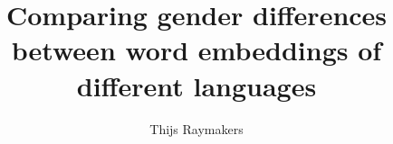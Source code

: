 \documentclass[man, biblatex, longtable]{apa7}
\title{Comparing gender differences between word embeddings of different languages}
\author{Thijs Raymakers}
\affiliation{Delft University of Technology}
\begin{document}
\maketitle






\iffalse

\fi

\printbibliography
\end{document}
